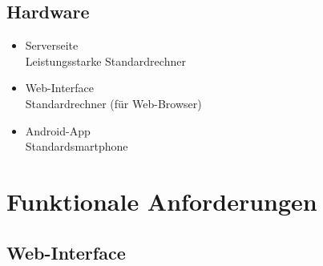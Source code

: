 \documentclass[a4paper]{scrreprt}
\begin{document}
        \section{Hardware}
            \begin{itemize}
                \item Serverseite\\
                    Leistungsstarke Standardrechner
                \item  \gls{Web-Interface}\\
                    Standardrechner (für Web-Browser)
                \item \gls{Android-App}\\
                    Standardsmartphone
            \end{itemize}

    \chapter{Funktionale Anforderungen}

        \section{\gls{Web-Interface}}
\end{document}

